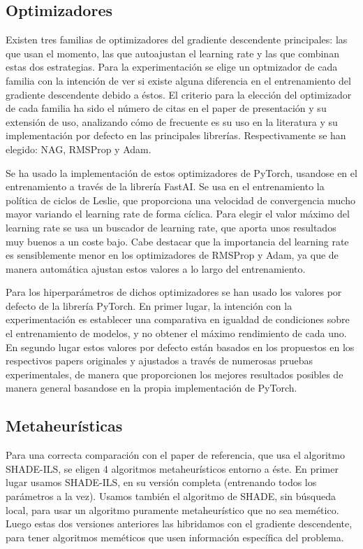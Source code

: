 \subsection{Optimizadores}

Existen tres familias de optimizadores del gradiente descendente principales: las que usan el momento, las que autoajustan el learning rate y las que combinan estas dos estrategias. Para la experimentación se elige un optmizador de cada familia con la intención de ver si existe alguna diferencia en el entrenamiento del gradiente descendente debido a éstos. El criterio para la elección del optimizador de cada familia ha sido el número de citas en el paper de presentación y su extensión de uso, analizando cómo de frecuente es su uso en la literatura y su implementación por defecto en las principales librerías. Respectivamente se han elegido: NAG, RMSProp y Adam.

Se ha usado la implementación de estos optimizadores de PyTorch, usandose en el entrenamiento a través de la librería FastAI. Se usa en el entrenamiento la política de ciclos de Leslie, que proporciona una velocidad de convergencia mucho mayor variando el learning rate de forma cíclica. Para elegir el valor máximo del learning rate se usa un buscador de learning rate, que aporta unos resultados muy buenos a un coste bajo. Cabe destacar que la importancia del learning rate es sensiblemente menor en los optimizadores de RMSProp y Adam, ya que de manera automática ajustan estos valores a lo largo del entrenamiento. 

Para los hiperparámetros de dichos optimizadores se han usado los valores por defecto de la librería PyTorch. En primer lugar, la intención con la experimentación es establecer una comparativa en igualdad de condiciones sobre el entrenamiento de modelos, y no obtener el máximo rendimiento de cada uno. En segundo lugar estos valores por defecto están basados en los propuestos en los respectivos papers originales y ajustados a través de numerosas pruebas experimentales, de manera que proporcionen los mejores resultados posibles de manera general basandose en la propia implementación de PyTorch. 


\subsection{Metaheurísticas}

Para una correcta comparación con el paper de referencia, que usa el algoritmo SHADE-ILS, se eligen 4 algoritmos metaheurísticos entorno a éste. En primer lugar usamos SHADE-ILS, en su versión completa (entrenando todos los parámetros a la vez). Usamos también el algoritmo de SHADE, sin búsqueda local, para usar un algoritmo puramente metaheurístico que no sea memético. Luego estas dos versiones anteriores las hibridamos con el gradiente descendente, para tener algoritmos meméticos que usen información específica del problema. 

